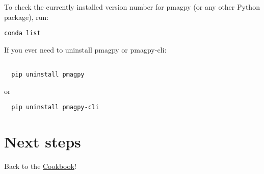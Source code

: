 \documentclass[11pt]{article}
\begin{document}
To check the currently installed version number for pmagpy (or any other Python package), run:
\begin{verbatim}
conda list
\end{verbatim}

If you ever need to uninstall pmagpy or pmagpy-cli:

\begin{verbatim}

  pip uninstall pmagpy
\end{verbatim}
  or
\begin{verbatim}
  pip uninstall pmagpy-cli
\end{verbatim}

\section{Next steps}

Back to the \href{https://earthref.org/PmagPy/cookbook/#next_steps}{Cookbook}!
\end{document}
